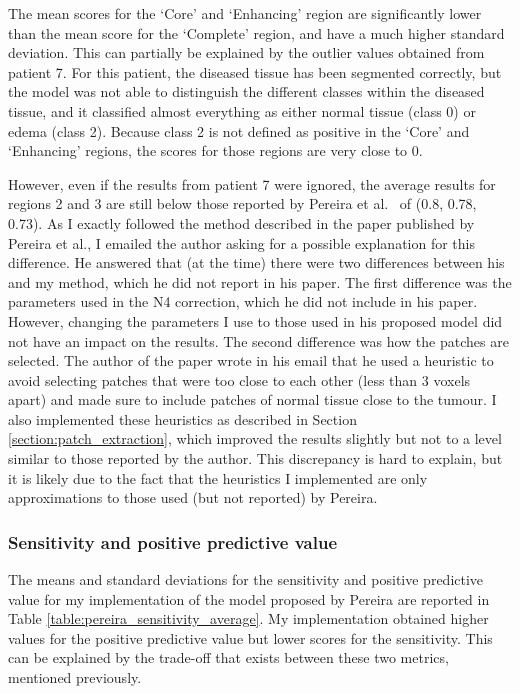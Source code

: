 \documentclass[12pt,a4paper,twoside,openright]{report}
\begin{document}
The mean scores for the `Core' and `Enhancing' region are significantly lower than the mean score for the `Complete' region, and have a much higher standard deviation. This can partially be explained by the outlier values obtained from patient 7. For this patient, the diseased tissue has been segmented correctly, but the model was not able to distinguish the different classes within the diseased tissue, and it classified almost everything as either normal tissue (class 0) or edema (class 2). Because class 2 is not defined as positive in the `Core' and `Enhancing' regions, the scores for those regions are very close to 0.  

However, even if the results from patient 7 were ignored, the average results for regions 2 and 3 are still below those reported by Pereira et al.\ \cite{pereira} of (0.8, 0.78, 0.73). As I exactly followed the method described in the paper published by Pereira et al., I emailed the author asking for a possible explanation for this difference. He answered that (at the time) there were two differences between his and my method, which he did not report in his paper. The first difference was the parameters used in the N4 correction, which he did not include in his paper. However, changing the parameters I use to those used in his proposed model did not have an impact on the results. The second difference was how the patches are selected. The author of the paper wrote in his email that he used a heuristic to avoid selecting patches that were too close to each other (less than 3 voxels apart) and made sure to include patches of normal tissue close to the tumour. I also implemented these heuristics as described in Section \ref{section:patch_extraction}, which improved the results slightly but not to a level similar to those reported by the author. This discrepancy is hard to explain, but it is likely due to the fact that the heuristics I implemented are only approximations to those used (but not reported) by Pereira.

\subsubsection{Sensitivity and positive predictive value}
The means and standard deviations for the sensitivity and positive predictive value for my implementation of the model proposed by Pereira are reported in Table \ref{table:pereira_sensitivity_average}. My implementation obtained higher values for the positive predictive value but lower scores for the sensitivity. This can be explained by the trade-off that exists between these two metrics, mentioned previously.
\end{document}

